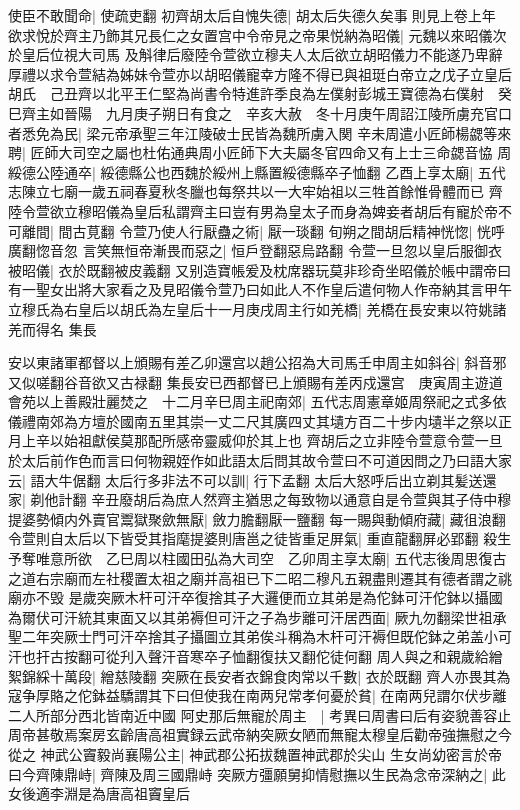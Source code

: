 使臣不敢聞命|{
	使疏吏翻}
初齊胡太后自愧失德|{
	胡太后失德久矣事則見上卷上年}
欲求悅於齊主乃飾其兄長仁之女置宫中令帝見之帝果悦納為昭儀|{
	元魏以來昭儀次於皇后位視大司馬}
及斛律后廢陸令萱欲立穆夫人太后欲立胡昭儀力不能遂乃卑辭厚禮以求令萱結為姊妹令萱亦以胡昭儀寵幸方隆不得已與祖珽白帝立之戊子立皇后胡氏　己丑齊以北平王仁堅為尚書令特進許季良為左僕射彭城王寶德為右僕射　癸巳齊主如晉陽　九月庚子朔日有食之　辛亥大赦　冬十月庚午周詔江陵所虜充官口者悉免為民|{
	梁元帝承聖三年江陵破士民皆為魏所虜入関}
辛未周遣小匠師楊勰等來聘|{
	匠師大司空之屬也杜佑通典周小匠師下大夫屬冬官四命又有上士三命勰音恊}
周綏德公陸通卒|{
	綏德縣公也西魏於綏州上縣置綏德縣卒子恤翻}
乙酉上享太廟|{
	五代志陳立七廟一歲五祠春夏秋冬臘也每祭共以一大牢始祖以三牲首餘惟骨體而已}
齊陸令萱欲立穆昭儀為皇后私謂齊主曰豈有男為皇太子而身為婢妾者胡后有寵於帝不可離間|{
	間古莧翻}
令萱乃使人行厭蠱之術|{
	厭一琰翻}
旬朔之間胡后精神恍惚|{
	恍呼廣翻惚音忽}
言笑無恒帝漸畏而惡之|{
	恒戶登翻惡烏路翻}
令萱一旦忽以皇后服御衣被昭儀|{
	衣於既翻被皮義翻}
又别造寶帳爰及枕席器玩莫非珍奇坐昭儀於帳中謂帝曰有一聖女出將大家看之及見昭儀令萱乃曰如此人不作皇后遣何物人作帝納其言甲午立穆氏為右皇后以胡氏為左皇后十一月庚戌周主行如羌橋|{
	羌橋在長安東以符姚諸羌而得名}
集長

安以東諸軍都督以上頒賜有差乙卯還宫以趙公招為大司馬壬申周主如斜谷|{
	斜音邪又似嗟翻谷音欲又古禄翻}
集長安已西都督已上頒賜有差丙戍還宫　庚寅周主遊道會苑以上善殿壯麗焚之　十二月辛巳周主祀南郊|{
	五代志周憲章姬周祭祀之式多依儀禮南郊為方壇於國南五里其崇一丈二尺其廣四丈其壝方百二十步内壝半之祭以正月上辛以始祖獻侯莫那配所感帝靈威仰於其上也}
齊胡后之立非陸令萱意令萱一旦於太后前作色而言曰何物親姪作如此語太后問其故令萱曰不可道因問之乃曰語大家云|{
	語大牛倨翻}
太后行多非法不可以訓|{
	行下孟翻}
太后大怒呼后出立剃其髪送還家|{
	剃他計翻}
辛丑廢胡后為庶人然齊主猶思之每致物以通意自是令萱與其子侍中穆提婆勢傾内外賣官鬻獄聚歛無厭|{
	斂力膽翻厭一鹽翻}
每一賜與動傾府藏|{
	藏徂浪翻}
令萱則自太后以下皆受其指麾提婆則唐邕之徒皆重足屏氣|{
	重直龍翻屏必郢翻}
殺生予奪唯意所欲　乙巳周以柱國田弘為大司空　乙卯周主享太廟|{
	五代志後周思復古之道右宗廟而左社稷置太祖之廟并高祖已下二昭二穆凡五親盡則遷其有德者謂之祧廟亦不毁}
是歲突厥木杆可汗卒復捨其子大邏便而立其弟是為佗鉢可汗佗鉢以攝國為爾伏可汗統其東面又以其弟褥但可汗之子為步離可汗居西面|{
	厥九勿翻梁世祖承聖二年突厥士門可汗卒捨其子攝圖立其弟俟斗稱為木杆可汗褥但既佗鉢之弟盖小可汗也扞古按翻可從刋入聲汗音寒卒子恤翻復扶又翻佗徒何翻}
周人與之和親歲給繒絮錦綵十萬段|{
	繒慈陵翻}
突厥在長安者衣錦食肉常以千數|{
	衣於既翻}
齊人亦畏其為寇争厚賂之佗鉢益驕謂其下曰但使我在南两兒常孝何憂於貧|{
	在南两兒謂尔伏步離二人所部分西北皆南近中國}
阿史那后無寵於周主　|{
	考異曰周書曰后有姿貌善容止周帝甚敬焉案房玄齡唐高祖實録云武帝納突厥女陋而無寵太穆皇后勸帝強撫慰之今從之}
神武公竇毅尚襄陽公主|{
	神武郡公拓拔魏置神武郡於尖山}
生女尚幼密言於帝曰今齊陳鼎峙|{
	齊陳及周三國鼎峙}
突厥方彊願舅抑情慰撫以生民為念帝深納之|{
	此女後適李淵是為唐高祖竇皇后}


